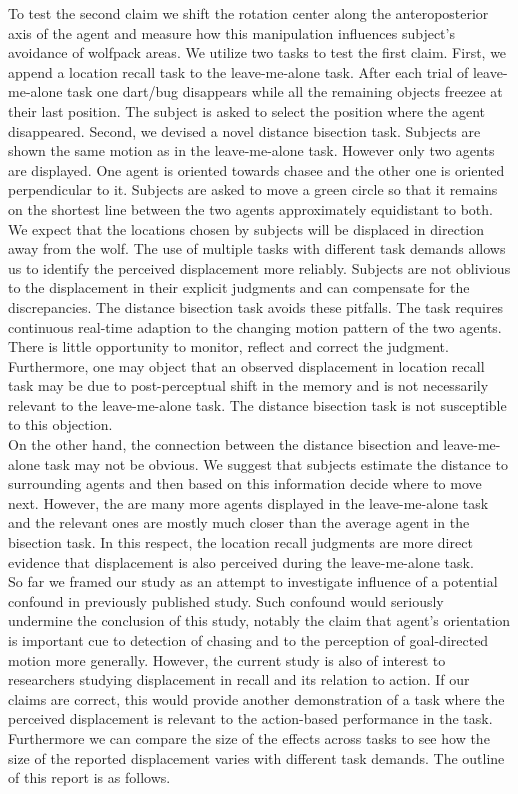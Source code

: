 \documentclass{article}
\begin{document}
To test the second claim we shift the rotation center along the anteroposterior axis of the agent and measure how this manipulation influences subject's avoidance of wolfpack areas. 
We utilize two tasks to test the first claim. 
First, we append a location recall task to the leave-me-alone task. 
After each trial of leave-me-alone task one dart/bug disappears while all the remaining objects freezee at their last position. 
The subject is asked to select the position where the agent disappeared.
Second, we devised a novel distance bisection task. 
Subjects are shown the same motion as in the leave-me-alone task. 
However only two agents are displayed. 
One agent is oriented towards chasee and the other one is oriented perpendicular to it. 
Subjects are asked to move a green circle so that it remains on the shortest line between the two agents approximately equidistant to both. 
We expect that the locations chosen by subjects will be displaced in direction away from the wolf. 
The use of multiple tasks with different task demands allows us to identify the perceived displacement more reliably. 
Subjects are not oblivious to the displacement in their explicit judgments and can compensate for the discrepancies. %
The distance bisection task avoids these pitfalls.
The task requires continuous real-time adaption to the changing motion pattern of the two agents. 
There is little opportunity to monitor, reflect and correct the judgment. 
Furthermore, one may object that an observed displacement in location recall task may be due to post-perceptual shift in the memory and is not necessarily relevant to the leave-me-alone task. 
The distance bisection task is not susceptible to this objection.\\
On the other hand, the connection between the distance bisection and leave-me-alone task may not be obvious. 
We suggest that subjects estimate the distance to surrounding agents and then based on this information decide where to move next. 
However, the are many more agents displayed in the leave-me-alone task and the relevant ones are mostly much closer than the average agent in the bisection task. 
In this respect, the location recall judgments are more direct evidence that displacement is also perceived during the leave-me-alone task. \\
So far we framed our study as an attempt to investigate influence of a potential confound in previously published study. 
Such confound would seriously undermine the conclusion of this study, notably the claim that agent's orientation is important cue to detection of chasing and to the perception of goal-directed motion more generally. %
However, the current study is also of interest to researchers studying displacement in recall and its relation to action. 
If our claims are correct, this would provide another demonstration of a task where the perceived displacement is relevant to the action-based performance in the task. 
Furthermore we can compare the size of the effects across tasks to see how the size of the reported displacement varies with different task demands.
The outline of this report is as follows. %
\end{document}
